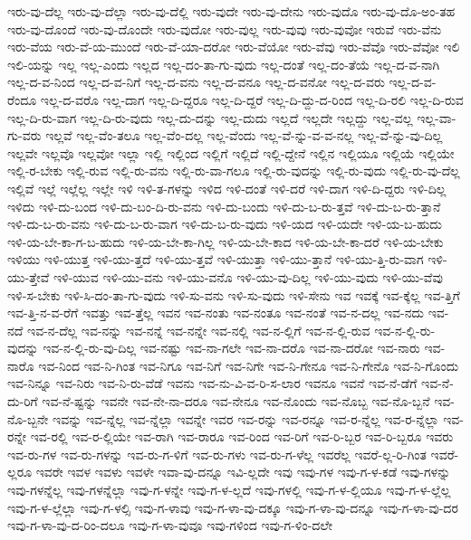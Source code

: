 {ಇರು-ವು-ದೆಲ್ಲ
ಇರು-ವು-ದೆಲ್ಲಾ
ಇರು-ವು-ದೆಲ್ಲಿ
ಇರು-ವುದೇ
ಇರು-ವು-ದೇನು
ಇರು-ವುದೊ
ಇರು-ವು-ದೊ-ಅಂ-ತಹ
ಇರು-ವು-ದೊಂದೆ
ಇರು-ವು-ದೊಂದೇ
ಇರು-ವುದೋ
ಇರು-ವುಲ್ಲ
ಇರು-ವುವು
ಇರು-ವುವೋ
ಇರುವೆ
ಇರು-ವೆನು
ಇರು-ವೆಯ
ಇರು-ವೆ-ಯ-ಮುಂದೆ
ಇರು-ವೆ-ಯಾ-ದರೋ
ಇರು-ವೆಯೋ
ಇರು-ವೆವು
ಇರು-ವೆವೊ
ಇರು-ವೆವೋ
ಇಲಿ
ಇಲಿ-ಯನ್ನು
ಇಲ್ಲ
ಇಲ್ಲ-ಎಂದು
ಇಲ್ಲದ
ಇಲ್ಲ-ದಂ-ತಾ-ಗು-ವುದು
ಇಲ್ಲ-ದಂತೆ
ಇಲ್ಲ-ದಂ-ತೆಯೆ
ಇಲ್ಲ-ದ-ವ-ನಾಗಿ
ಇಲ್ಲ-ದ-ವ-ನಿಂದ
ಇಲ್ಲ-ದ-ವ-ನಿಗೆ
ಇಲ್ಲ-ದ-ವನು
ಇಲ್ಲ-ದ-ವನೂ
ಇಲ್ಲ-ದ-ವನೋ
ಇಲ್ಲ-ದ-ವರು
ಇಲ್ಲ-ದ-ವ-ರೆಂದೂ
ಇಲ್ಲ-ದ-ವರೊ
ಇಲ್ಲ-ದಾಗ
ಇಲ್ಲ-ದಿ-ದ್ದರೂ
ಇಲ್ಲ-ದಿ-ದ್ದರೆ
ಇಲ್ಲ-ದಿ-ದ್ದು-ದ-ರಿಂದ
ಇಲ್ಲ-ದಿ-ರಲಿ
ಇಲ್ಲ-ದಿ-ರುವ
ಇಲ್ಲ-ದಿ-ರು-ವಾಗ
ಇಲ್ಲ-ದಿ-ರು-ವುದು
ಇಲ್ಲ-ದು-ದನ್ನು
ಇಲ್ಲ-ದುದು
ಇಲ್ಲದೆ
ಇಲ್ಲದೇ
ಇಲ್ಲದ್ದು
ಇಲ್ಲ-ವಲ್ಲ
ಇಲ್ಲ-ವಾ-ಗು-ವರು
ಇಲ್ಲವೆ
ಇಲ್ಲ-ವೆಂ-ತಲೂ
ಇಲ್ಲ-ವೆಂ-ದಲ್ಲ
ಇಲ್ಲ-ವೆಂದು
ಇಲ್ಲ-ವೆ-ನ್ನು-ವ-ವ-ನಲ್ಲ
ಇಲ್ಲ-ವೆ-ನ್ನು-ವು-ದಿಲ್ಲ
ಇಲ್ಲವೇ
ಇಲ್ಲವೊ
ಇಲ್ಲವೋ
ಇಲ್ಲಾ
ಇಲ್ಲಿ
ಇಲ್ಲಿಂದ
ಇಲ್ಲಿಗೆ
ಇಲ್ಲಿದೆ
ಇಲ್ಲಿ-ದ್ದೇನೆ
ಇಲ್ಲಿನ
ಇಲ್ಲಿಯೂ
ಇಲ್ಲಿಯೆ
ಇಲ್ಲಿಯೇ
ಇಲ್ಲಿ-ರ-ಬೇಕು
ಇಲ್ಲಿ-ರುವ
ಇಲ್ಲಿ-ರು-ವನು
ಇಲ್ಲಿ-ರು-ವಾ-ಗಲೂ
ಇಲ್ಲಿ-ರು-ವುದನ್ನು
ಇಲ್ಲಿ-ರು-ವುದು
ಇಲ್ಲಿ-ರು-ವು-ದೆಲ್ಲ
ಇಲ್ಲಿವೆ
ಇಲ್ಲೆ
ಇಲ್ಲೆಲ್ಲ
ಇಲ್ಲೇ
ಇಳಿ
ಇಳಿ-ತ-ಗಳನ್ನು
ಇಳಿದ
ಇಳಿ-ದಂತೆ
ಇಳಿ-ದರೆ
ಇಳಿ-ದಾಗ
ಇಳಿ-ದಿ-ದ್ದರು
ಇಳಿ-ದಿಲ್ಲ
ಇಳಿದು
ಇಳಿ-ದು-ಬಂದ
ಇಳಿ-ದು-ಬಂ-ದಿ-ರು-ವನು
ಇಳಿ-ದು-ಬಂದು
ಇಳಿ-ದು-ಬ-ರು-ತ್ತವೆ
ಇಳಿ-ದು-ಬ-ರು-ತ್ತಾನೆ
ಇಳಿ-ದು-ಬ-ರು-ವನು
ಇಳಿ-ದು-ಬ-ರು-ವಾಗ
ಇಳಿ-ದು-ಬ-ರು-ವುದು
ಇಳಿ-ಯದ
ಇಳಿ-ಯದೇ
ಇಳಿ-ಯ-ಬ-ಹುದು
ಇಳಿ-ಯ-ಬೇ-ಕಾ-ಗ-ಬ-ಹುದು
ಇಳಿ-ಯ-ಬೇ-ಕಾ-ಗಿಲ್ಲ
ಇಳಿ-ಯ-ಬೇ-ಕಾದ
ಇಳಿ-ಯ-ಬೇ-ಕಾ-ದರೆ
ಇಳಿ-ಯ-ಬೇಕು
ಇಳಿಯು
ಇಳಿ-ಯುತ್ತ
ಇಳಿ-ಯು-ತ್ತದೆ
ಇಳಿ-ಯು-ತ್ತವೆ
ಇಳಿ-ಯುತ್ತಾ
ಇಳಿ-ಯು-ತ್ತಾನೆ
ಇಳಿ-ಯು-ತ್ತಿ-ರು-ವಾಗ
ಇಳಿ-ಯು-ತ್ತೇವೆ
ಇಳಿ-ಯುವ
ಇಳಿ-ಯು-ವನು
ಇಳಿ-ಯು-ವನೊ
ಇಳಿ-ಯು-ವು-ದಿಲ್ಲ
ಇಳಿ-ಯು-ವುದು
ಇಳಿ-ಯು-ವೆವು
ಇಳಿ-ಸ-ಬೇಕು
ಇಳಿ-ಸಿ-ದಂ-ತಾ-ಗು-ವುದು
ಇಳಿ-ಸು-ವನು
ಇಳಿ-ಸು-ವುದು
ಇಳಿ-ಸೇನು
ಇವ
ಇವಕ್ಕೆ
ಇವ-ಕ್ಕೆಲ್ಲ
ಇವ-ತ್ತಿಗೆ
ಇವ-ತ್ತಿ-ನ-ವ-ರೆಗೆ
ಇವತ್ತು
ಇವ-ತ್ತೆಲ್ಲ
ಇವನ
ಇವ-ನಂತು
ಇವ-ನಂತೂ
ಇವ-ನಂತೆ
ಇವ-ನ-ದಲ್ಲ
ಇವ-ನದು
ಇವ-ನದೆ
ಇವ-ನ-ದೆಲ್ಲ
ಇವ-ನನ್ನು
ಇವ-ನನ್ನೆ
ಇವ-ನನ್ನೇ
ಇವ-ನಲ್ಲಿ
ಇವ-ನ-ಲ್ಲಿಗೆ
ಇವ-ನ-ಲ್ಲಿ-ರುವ
ಇವ-ನ-ಲ್ಲಿ-ರು-ವುದನ್ನು
ಇವ-ನ-ಲ್ಲಿ-ರು-ವು-ದಿಲ್ಲ
ಇವ-ನಷ್ಟು
ಇವ-ನಾ-ಗಲೇ
ಇವ-ನಾ-ದರೊ
ಇವ-ನಾ-ದರೋ
ಇವ-ನಾರು
ಇವ-ನಾರೊ
ಇವ-ನಿಂದ
ಇವ-ನಿ-ಗಿಂತ
ಇವ-ನಿಗೂ
ಇವ-ನಿಗೆ
ಇವ-ನಿಗೇ
ಇವ-ನಿ-ಗೇನೂ
ಇವ-ನಿ-ಗೇನೊ
ಇವ-ನಿ-ಗೊಂದು
ಇವ-ನಿನ್ನೂ
ಇವ-ನಿರು
ಇವ-ನಿ-ರು-ವೆಡೆ
ಇವನು
ಇವ-ನು-ವಿ-ವ-ರಿ-ಸ-ಲಾರ
ಇವನೂ
ಇವನೆ
ಇವ-ನೆ-ಡೆಗೆ
ಇವ-ನೆ-ದು-ರಿಗೆ
ಇವ-ನೆ-ಷ್ಟನ್ನು
ಇವನೇ
ಇವ-ನೇ-ನಾ-ದರೂ
ಇವ-ನೇನೂ
ಇವ-ನೊಂದು
ಇವ-ನೊಬ್ಬ
ಇವ-ನೊ-ಬ್ಬನೆ
ಇವ-ನೊ-ಬ್ಬನೇ
ಇವನ್ನು
ಇವ-ನ್ನೆಲ್ಲ
ಇವ-ನ್ನೆಲ್ಲಾ
ಇವನ್ನೇ
ಇವರ
ಇವ-ರನ್ನು
ಇವ-ರನ್ನೂ
ಇವ-ರ-ನ್ನೆಲ್ಲ
ಇವ-ರ-ನ್ನೆಲ್ಲಾ
ಇವ-ರನ್ನೇ
ಇವ-ರಲ್ಲಿ
ಇವ-ರ-ಲ್ಲಿಯೇ
ಇವ-ರಾಗಿ
ಇವ-ರಾರೂ
ಇವ-ರಿಂದ
ಇವ-ರಿಗೆ
ಇವ-ರಿ-ಬ್ಬರ
ಇವ-ರಿ-ಬ್ಬರೂ
ಇವರು
ಇವ-ರು-ಗಳ
ಇವ-ರು-ಗಳನ್ನು
ಇವ-ರು-ಗ-ಳಿಗೆ
ಇವ-ರು-ಗಳು
ಇವ-ರು-ಗ-ಳೆಲ್ಲ
ಇವರೆಲ್ಲ
ಇವರೆ-ಲ್ಲ-ರಿ-ಗಿಂತ
ಇವರೆ-ಲ್ಲರೂ
ಇವರೇ
ಇವಳ
ಇವಳು
ಇವಳೇ
ಇವಾ-ವು-ದನ್ನೂ
ಇವಿ-ಲ್ಲದೇ
ಇವು
ಇವು-ಗಳ
ಇವು-ಗ-ಳ-ಕಡೆ
ಇವು-ಗಳನ್ನು
ಇವು-ಗಳನ್ನೆಲ್ಲ
ಇವು-ಗಳನ್ನೆಲ್ಲಾ
ಇವು-ಗ-ಳನ್ನೇ
ಇವು-ಗ-ಳ-ಲ್ಲದೆ
ಇವು-ಗಳಲ್ಲಿ
ಇವು-ಗ-ಳ-ಲ್ಲಿಯೂ
ಇವು-ಗ-ಳ-ಲ್ಲೆಲ್ಲ
ಇವು-ಗ-ಳ-ಲ್ಲೆಲ್ಲಾ
ಇವು-ಗ-ಳಲ್ಸಿ
ಇವು-ಗ-ಳಾವು
ಇವು-ಗ-ಳಾ-ವು-ದಕ್ಕೂ
ಇವು-ಗ-ಳಾ-ವು-ದನ್ನೂ
ಇವು-ಗ-ಳಾ-ವು-ದರ
ಇವು-ಗ-ಳಾ-ವು-ದ-ರಿಂ-ದಲೂ
ಇವು-ಗ-ಳಾ-ವುವೂ
ಇವು-ಗಳಿಂದ
ಇವು-ಗ-ಳಿಂ-ದಲೇ
}
